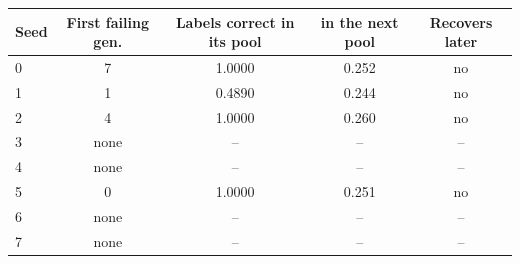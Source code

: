 \begin{tabular}{@{}lcccc@{}}
\toprule
Seed & First failing gen. & Labels correct in its pool & in the next pool & Recovers later\\
\midrule
0 & 7 & 1.0000 & 0.252 & no \\
1 & 1 & 0.4890 & 0.244 & no \\
2 & 4 & 1.0000 & 0.260 & no \\
3 & none & -- & -- & -- \\
4 & none & -- & -- & -- \\
5 & 0 & 1.0000 & 0.251 & no \\
6 & none & -- & -- & -- \\
7 & none & -- & -- & -- \\
\bottomrule
\end{tabular}
